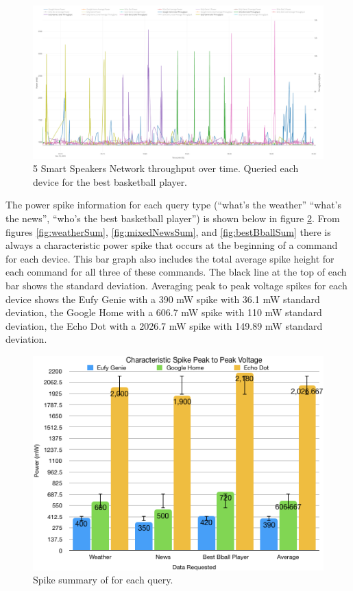 \begin{figure}[H]
  \centering
  \includegraphics[width=1\textwidth]{figures/bestBballNetwork.png}
  \caption{5 Smart Speakers Network throughput over time. Queried each device for the best basketball player.}
  \label{fig:bestBballNetwork}
\end{figure}

The power spike information for each query type (``what's the weather'' ``what's the news'', ``who's the best basketball player'') is shown below in figure \ref{fig:spikeVoltages}. From figures \ref{fig:weatherSum}, \ref{fig:mixedNewsSum}, and \ref{fig:bestBballSum} there is always a characteristic power spike that occurs at the beginning of a command for each device. This bar graph also includes the total average spike height for each command for all three of these commands. The black line at the top of each bar shows the standard deviation. Averaging peak to peak voltage spikes for each device shows the Eufy Genie with a 390 mW spike with 36.1 mW standard deviation, the Google Home with a 606.7 mW spike with 110 mW standard deviation, the Echo Dot with a 2026.7 mW spike with 149.89 mW standard deviation.

\begin{figure}[H]
  \centering
  \includegraphics[width=1\textwidth]{figures/spikeVoltages.png}
  \caption{Spike summary of for each query.}
  \label{fig:spikeVoltages}
\end{figure}

